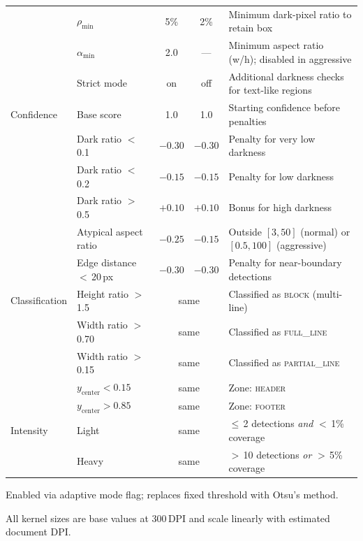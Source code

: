 \begin{table}[t]
\begin{threeparttable}
{\begin{tabular}{llccp{6.5cm}}
      & $\rho_{\min}$ & 5\% & 2\% & Minimum dark-pixel ratio to retain box \\
      & $\alpha_{\min}$ & 2.0 & --- & Minimum aspect ratio (w/h); disabled in aggressive \\
      & Strict mode & on & off & Additional darkness checks for text-like regions \\
    \midrule
    Confidence
      & Base score & 1.0 & 1.0 & Starting confidence before penalties \\
      & Dark ratio $<$\,0.1 & $-0.30$ & $-0.30$ & Penalty for very low darkness \\
      & Dark ratio $<$\,0.2 & $-0.15$ & $-0.15$ & Penalty for low darkness \\
      & Dark ratio $>$\,0.5 & $+0.10$ & $+0.10$ & Bonus for high darkness \\
      & Atypical aspect ratio & $-0.25$ & $-0.15$ & Outside $[3, 50]$ (normal) or $[0.5, 100]$ (aggressive) \\
      & Edge distance $<$\,20\,px & $-0.30$ & $-0.30$ & Penalty for near-boundary detections \\
    \midrule
    Classification
      & Height ratio $>$\,1.5 & \multicolumn{2}{c}{same} & Classified as \textsc{block} (multi-line) \\
      & Width ratio $>$\,0.70 & \multicolumn{2}{c}{same} & Classified as \textsc{full\_line} \\
      & Width ratio $>$\,0.15 & \multicolumn{2}{c}{same} & Classified as \textsc{partial\_line} \\
      & $y_{\text{center}} < 0.15$ & \multicolumn{2}{c}{same} & Zone: \textsc{header} \\
      & $y_{\text{center}} > 0.85$ & \multicolumn{2}{c}{same} & Zone: \textsc{footer} \\
    \midrule
    Intensity
      & Light & \multicolumn{2}{c}{same} & $\leq$\,2 detections \textit{and} $<$\,1\% coverage \\
      & Heavy & \multicolumn{2}{c}{same} & $>$\,10 detections \textit{or} $>$\,5\% coverage \\
    \bottomrule
  \end{tabular}}%
  \begin{tablenotes}
    \footnotesize
    \item[a] Enabled via adaptive mode flag; replaces fixed threshold with Otsu's method.
    \item[b] All kernel sizes are base values at 300\,DPI and scale linearly with estimated document DPI.
  \end{tablenotes}
  \end{threeparttable}
\end{table}
